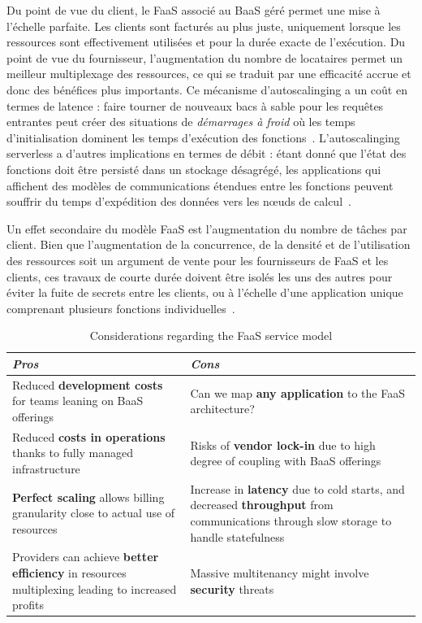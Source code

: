 Du point de vue du client, le FaaS associé au BaaS géré permet une mise à l'échelle parfaite. Les clients sont facturés au plus juste, uniquement lorsque les ressources sont effectivement utilisées et pour la durée exacte de l'exécution. Du point de vue du fournisseur, l'augmentation du nombre de locataires permet un meilleur multiplexage des ressources, ce qui se traduit par une efficacité accrue et donc des bénéfices plus importants. Ce mécanisme d'autoscalinging a un coût en termes de latence : faire tourner de nouveaux bacs à sable pour les requêtes entrantes peut créer des situations de \textit{démarrages à froid} où les temps d'initialisation dominent les temps d'exécution des fonctions~\cite{Jiang2021TowardsDS}. L'autoscalinging serverless a d'autres implications en termes de débit : étant donné que l'état des fonctions doit être persisté dans un stockage désagrégé, les applications qui affichent des modèles de communications étendues entre les fonctions peuvent souffrir du temps d'expédition des données vers les nœuds de calcul~\cite{mullerLambadaInteractiveData2020}.

Un effet secondaire du modèle FaaS est l'augmentation du nombre de tâches par client. Bien que l'augmentation de la concurrence, de la densité et de l'utilisation des ressources soit un argument de vente pour les fournisseurs de FaaS et les clients, ces travaux de courte durée doivent être isolés les uns des autres pour éviter la fuite de secrets entre les clients, ou à l'échelle d'une application unique comprenant plusieurs fonctions individuelles~\cite{vaqueroLockingSkySurvey2011}.

\begin{table}[H]
    \caption{Considerations regarding the FaaS service model}
    \centering
    \begin{tabularx}{\textwidth} { 
      | >{\centering\arraybackslash}X 
      | >{\centering\arraybackslash}X  | }
     \hline
        \textit{Pros} & \textit{Cons} \\ \hline
        Reduced \textbf{development costs} for teams leaning on BaaS offerings & Can we map \textbf{any application} to the FaaS architecture? \\ \hline
        Reduced \textbf{costs in operations} thanks to fully managed infrastructure & Risks of \textbf{vendor lock-in} due to high degree of coupling with BaaS offerings \\ \hline
        \textbf{Perfect scaling} allows billing granularity close to actual use of resources & Increase in \textbf{latency} due to cold starts, and decreased \textbf{throughput} from communications through slow storage to handle statefulness \\ \hline
        Providers can achieve \textbf{better efficiency} in resources multiplexing leading to increased profits & Massive multitenancy might involve \textbf{security} threats \\ \hline
    \end{tabularx}
    \label{table:serverless-tradeoffs}
\end{table}

